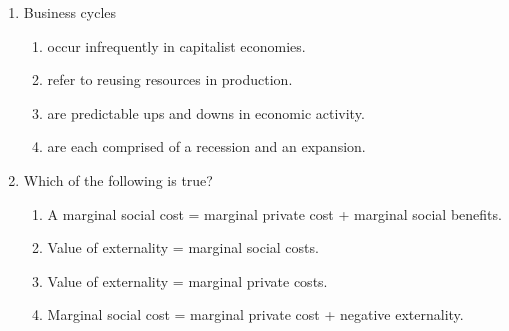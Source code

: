 \documentclass[12pt]{article}
\begin{document}
\begin{enumerate}[label=\arabic*.]
\begin{enumerate}[label=(\alph*)]
    \item The consumer price index
    \item The real interest rate
    \item The unemployment rate
    \item The GDP deflator
\end{enumerate}
\item Business cycles
\begin{enumerate}[label=(\alph*)]
    \item occur infrequently in capitalist economies.
    \item refer to reusing resources in production.
    \item are predictable ups and downs in economic activity.
    \item are each comprised of a recession and an expansion.
\end{enumerate}
\item Which of the following is true?
\begin{enumerate}[label=(\alph*)]
    \item A marginal social cost = marginal private cost + marginal social benefits.
    \item Value of externality = marginal social costs.
    \item Value of externality = marginal private costs.
    \item Marginal social cost = marginal private cost + negative externality.
\end{enumerate}
\end{enumerate}
\end{document}
